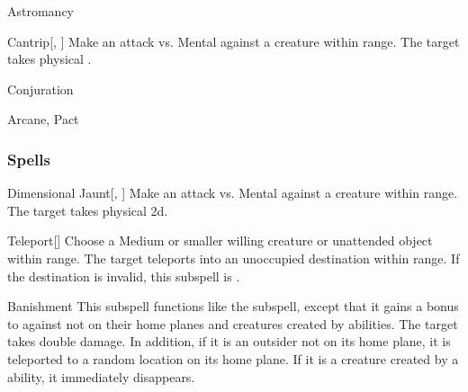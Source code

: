\newpage
\begin{spellsection}{Astromancy}

\begin{spellheader}
\end{spellheader}


\begin{ability}{Cantrip}[, ]
Make an attack vs. Mental against a creature within \rngmed range.
\hit The target takes physical .
\end{ability}




 Conjuration

 Arcane, Pact
\end{spellsection}


\subsubsection{Spells}


\begin{ability}[\nth{1}]{Dimensional Jaunt}[, ]
Make an attack vs. Mental against a creature within \rngmed range.
\hit The target takes physical  \plus2d.
\end{ability}
\vspace{0.25em}



\begin{ability}[\nth{1}]{Teleport}[]
Choose a Medium or smaller willing creature or unattended object within \rngclose range.
The target teleports into an unoccupied destination within range.
If the destination is invalid, this subspell is .
\end{ability}
\vspace{0.25em}



\begin{ability}[\nth{2}]{Banishment}
This subspell functions like the  subspell, except that it gains a  bonus to  against  not on their home planes and creatures created by  abilities.
\crit The target takes double damage.
In addition, if it is an outsider not on its home plane, it is teleported to a random location on its home plane.
If it is a creature created by a  ability, it immediately disappears.
\end{ability}
\vspace{0.25em}



